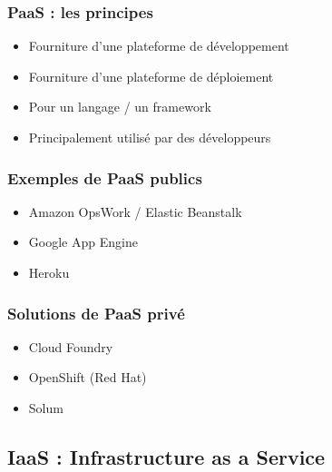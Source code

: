   \begin{frame}
    \frametitle{PaaS : les principes}
    \begin{itemize}
      \item Fourniture d'une plateforme de développement
      \item Fourniture d'une plateforme de déploiement
      \item Pour un langage / un framework
      \item Principalement utilisé par des développeurs
    \end{itemize}
  \end{frame}

  \begin{frame}
    \frametitle{Exemples de PaaS publics}
    \begin{itemize}
      \item Amazon OpsWork / Elastic Beanstalk
      \item Google App Engine
      \item Heroku
    \end{itemize}
  \end{frame}

  \begin{frame}
    \frametitle{Solutions de PaaS privé}
    \begin{itemize}
      \item Cloud Foundry
      \item OpenShift (Red Hat)\pause
      \item Solum
    \end{itemize}
  \end{frame}

  \subsection[IaaS]{IaaS : Infrastructure as a Service}

